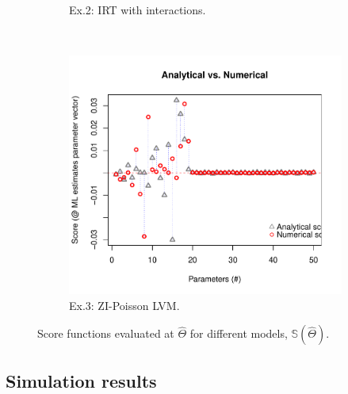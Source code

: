 \documentclass[11pt, a4paper]{article}
\begin{document}
\begin{figure}[h]
\begin{subfigure}[b]{0.45\textwidth}
\caption{Ex.2: IRT with interactions.}
\label{fig:AppScoreSim2}
\end{subfigure}
\\ 
\begin{subfigure}[b]{0.45\textwidth}
\includegraphics[scale = 0.5]{ScoreZIPlinQT.pdf}
\caption{Ex.3: ZI-Poisson LVM.}
\label{fig:AppScoreSim3}
\end{subfigure}
\caption{Score functions evaluated at $\hat{\Theta}$ for different models, $\mathbb{S}(\hat{\Theta})$.}
\label{fig:AppScore}
\end{figure}

\newpage

\subsection{Simulation results}
\end{document}
